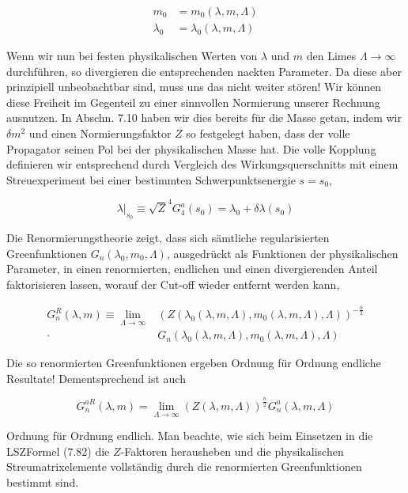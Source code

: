\documentclass[10pt, letterpaper]{article}
\begin{document}
$$
\begin{aligned}
m_{0} & =m_{0}(\lambda, m, \Lambda) \\
\lambda_{0} & =\lambda_{0}(\lambda, m, \Lambda)
\end{aligned}
$$

Wenn wir nun bei festen physikalischen Werten von $\lambda$ und $m$ den Limes $\Lambda \rightarrow \infty$ durchführen, so divergieren die entsprechenden nackten Parameter. Da diese aber prinzipiell unbeobachtbar sind, muss uns das nicht weiter stören! Wir können diese Freiheit im Gegenteil zu einer sinnvollen Normierung unserer Rechnung ausnutzen. In Abschn. 7.10 haben wir dies bereits für die Masse getan, indem wir $\delta m^{2}$ und einen Normierungsfaktor $Z$ so festgelegt haben, dass der volle Propagator seinen Pol bei der physikalischen Masse hat. Die volle Kopplung definieren wir entsprechend durch Vergleich des Wirkungsquerschnitts mit einem Streuexperiment bei einer bestimmten Schwerpunktsenergie $s=s_{0}$,

$$
\left.\lambda\right|_{s_{0}} \equiv \sqrt{Z}^{4} G_{4}^{a}\left(s_{0}\right)=\lambda_{0}+\delta \lambda\left(s_{0}\right)
$$

Die Renormierungstheorie zeigt, dass sich sämtliche regularisierten Greenfunktionen $G_{n}\left(\lambda_{0}, m_{0}, \Lambda\right)$, ausgedrückt als Funktionen der physikalischen Parameter, in einen renormierten, endlichen und einen divergierenden Anteil faktorisieren lassen, worauf der Cut-off wieder entfernt werden kann,

$$
\begin{aligned}
G_{n}^{R}(\lambda, m) \equiv \lim _{\Lambda \rightarrow \infty} & \left(Z\left(\lambda_{0}(\lambda, m, \Lambda), m_{0}(\lambda, m, \Lambda), \Lambda\right)\right)^{-\frac{n}{2}} \\
\cdot & G_{n}\left(\lambda_{0}(\lambda, m, \Lambda), m_{0}(\lambda, m, \Lambda), \Lambda\right)
\end{aligned}
$$

Die so renormierten Greenfunktionen ergeben Ordnung für Ordnung endliche Resultate! Dementsprechend ist auch

$$
G_{n}^{a R}(\lambda, m)=\lim _{\Lambda \rightarrow \infty}(Z(\lambda, m, \Lambda))^{\frac{n}{2}} G_{n}^{a}(\lambda, m, \Lambda)
$$

Ordnung für Ordnung endlich. Man beachte, wie sich beim Einsetzen in die LSZFormel (7.82) die $Z$-Faktoren herausheben und die physikalischen Streumatrixelemente vollständig durch die renormierten Greenfunktionen bestimmt sind.
\end{document}
